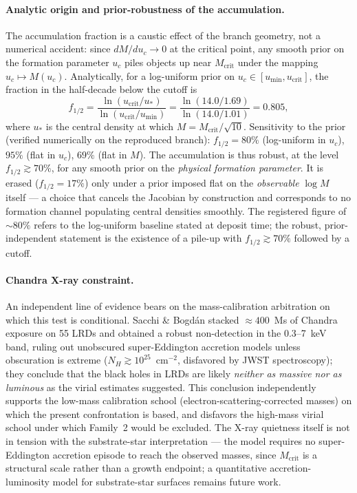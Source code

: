 \documentclass[11pt,a4paper]{article}
\theoremstyle{plain}
\theoremstyle{remark}
\begin{document}
\paragraph{Analytic origin and prior-robustness of the accumulation.} The accumulation fraction is a caustic effect of the branch geometry, not a numerical accident: since $dM/du_c \to 0$ at the critical point, any smooth prior on the formation parameter $u_c$ piles objects up near $M_{\text{crit}}$ under the mapping $u_c \mapsto M(u_c)$. Analytically, for a log-uniform prior on $u_c \in [u_{\min}, u_{\text{crit}}]$, the fraction in the half-decade below the cutoff is
\begin{equation}
f_{1/2} = \frac{\ln(u_{\text{crit}}/u_*)}{\ln(u_{\text{crit}}/u_{\min})} = \frac{\ln(14.0/1.69)}{\ln(14.0/1.01)} = 0.805,
\end{equation}
where $u_*$ is the central density at which $M = M_{\text{crit}}/\sqrt{10}$. Sensitivity to the prior (verified numerically on the reproduced branch): $f_{1/2} = 80\%$ (log-uniform in $u_c$), $95\%$ (flat in $u_c$), $69\%$ (flat in $M$). The accumulation is thus robust, at the level $f_{1/2} \gtrsim 70\%$, for any smooth prior on the \emph{physical formation parameter}. It is erased ($f_{1/2} = 17\%$) only under a prior imposed flat on the \emph{observable} $\log M$ itself --- a choice that cancels the Jacobian by construction and corresponds to no formation channel populating central densities smoothly. The registered figure of $\sim80\%$ refers to the log-uniform baseline stated at deposit time; the robust, prior-independent statement is the existence of a pile-up with $f_{1/2} \gtrsim 70\%$ followed by a cutoff.

\paragraph{Chandra X-ray constraint.} An independent line of evidence bears on the mass-calibration arbitration on which this test is conditional. Sacchi \& Bogd\'an \cite{sacchi2025} stacked $\approx400$~Ms of Chandra exposure on 55 LRDs and obtained a robust non-detection in the 0.3--7~keV band, ruling out unobscured super-Eddington accretion models unless obscuration is extreme ($N_H \gtrsim 10^{25}$~cm$^{-2}$, disfavored by JWST spectroscopy); they conclude that the black holes in LRDs are likely \emph{neither as massive nor as luminous} as the virial estimates suggested. This conclusion independently supports the low-mass calibration school (electron-scattering-corrected masses) on which the present confrontation is based, and disfavors the high-mass virial school under which Family~2 would be excluded. The X-ray quietness itself is not in tension with the substrate-star interpretation --- the model requires no super-Eddington accretion episode to reach the observed masses, since $M_{\text{crit}}$ is a structural scale rather than a growth endpoint; a quantitative accretion-luminosity model for substrate-star surfaces remains future work.
\end{document}
